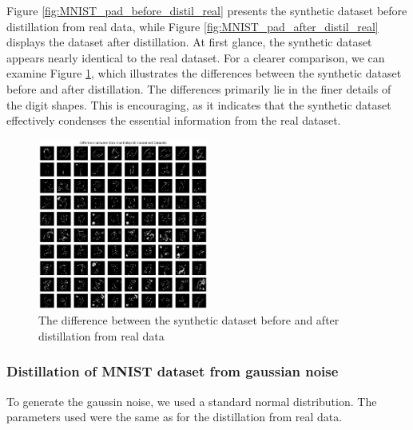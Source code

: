 \documentclass[onecolumn]{IEEEtran}
\begin{document}
Figure \ref{fig:MNIST_pad_before_distil_real} presents the synthetic dataset before distillation from real data, while Figure \ref{fig:MNIST_pad_after_distil_real} displays the dataset after distillation. At first glance, the synthetic dataset appears nearly identical to the real dataset. For a clearer comparison, we can examine Figure \ref{fig:MNIST_2_diff_real}, which illustrates the differences between the synthetic dataset before and after distillation. The differences primarily lie in the finer details of the digit shapes. This is encouraging, as it indicates that the synthetic dataset effectively condenses the essential information from the real dataset.

\begin{figure}[H]
    \centering
    \includegraphics[width=0.5\textwidth]{images/MNIST_2_diff_real.png}
    \caption{The difference between the synthetic dataset before and after distillation from real data}
    \label{fig:MNIST_2_diff_real}
\end{figure}

\subsubsection{Distillation of MNIST dataset from gaussian noise}
To generate the gaussin noise, we used a standard normal distribution. The parameters used were the same as for the distillation from real data.
\end{document}
